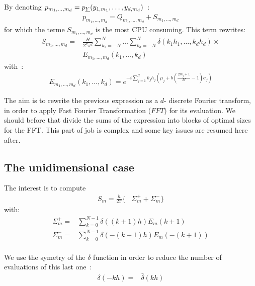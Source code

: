 By denoting $p_{m_1,\hdots,m_d}=p_{{\underline{Y}}}(y_{1,m_1},\hdots,y_{d,m_d})$~:
\begin{align}
  p_{m_1,\hdots,m_d}= Q_{m_1,\hdots,m_d}+S_{m_1,\hdots,m_d}
\end{align}
for which the terme $S_{m_1,\hdots,m_d}$ is the most CPU consuming. This term rewrites:
\begin{align}
S_{m_1,\hdots,m_d}=&\frac{H}{2^d\pi^d}\sum_{k_1=-N}^{N}\hdots\sum_{k_d=-N}^{N}\delta\left(k_1h_1,\hdots,k_dh_d\right)\times\nonumber\\
&E_{m_1,\hdots,m_d}(k_1,\hdots,k_d)
\end{align}
with~:
\begin{align}
  E_{m_1,\hdots,m_d}(k_1,\hdots,k_d)=e^{-i\sum_{j=1}^d k_jh_j\left(\mu_j+b\left(\frac{2m_j+1}{M}-1\right)\sigma_j\right)}
\end{align}

The aim is to rewrite the previous expression as a $d$- discrete Fourier transform, in order to apply Fast Fourier Transformation ($FFT$) for its evaluation.
We should before that divide the sums of the expression into blocks of optimal sizes for the FFT. This part of job is complex and some key issues are resumed here after.

\subsection{The unidimensional case}

The interest is to compute
\begin{align}
S_{m}=\frac{h}{2\pi}\Big\{&\Sigma_{m}^{+} + \Sigma_{m}^{-} \Big\}
\end{align}
with:
\begin{align}
\Sigma_{m}^{+}=&\sum_{k=0}^{N-1}\delta\left((k+1)h\right)E_{m}(k+1)\\
\Sigma_{m}^{-}=&\sum_{k=0}^{N-1}\delta\left(-(k+1)h\right)E_{m}(-(k+1))\\
\end{align}

We use the symetry of the $\delta$ function in order to reduce the number of evaluations of this last one~:
\begin{align*}
\delta\left(-kh\right)=&\bar{\delta}\left(kh\right)\\
\end{align*}


